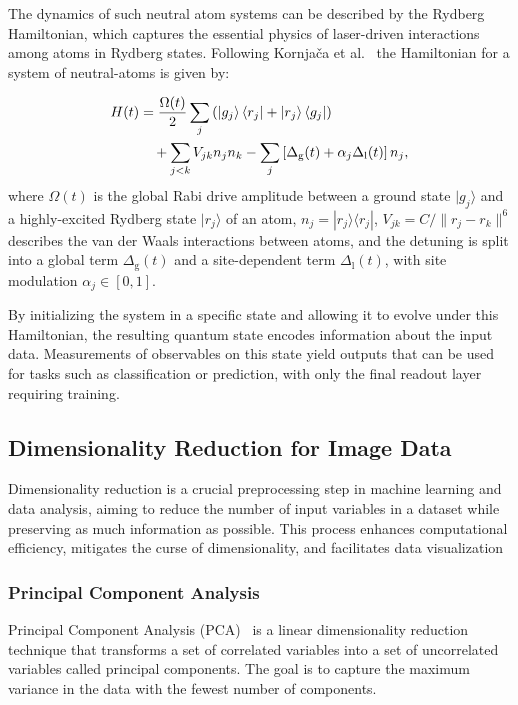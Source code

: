 \documentclass[conference]{IEEEtran}
\begin{document}
The dynamics of such neutral atom systems can be 
described by the Rydberg Hamiltonian, which captures 
the essential physics of laser-driven interactions 
among atoms in Rydberg states. Following Kornjača et al.~\cite{kornjavcaLargescaleQuantumReservoir2024}
the Hamiltonian for a system of neutral-atoms is given by:

\begin{equation}
    \begin{aligned}
        H(t) &= \dfrac{\Omega(t)}{2}\sum_j \left(\ket{g_j}\bra{r_j}+\ket{r_j}\bra{g_j}\right) \\
             &{{\quad}} + \sum_{j<k}V_{jk}n_jn_k - \sum_j \left[\Delta_{\mathrm{g}}(t) + \alpha_j\Delta_{\mathrm{l}}(t)\right] n_j,
    \end{aligned}
    \label{eq:rydberg_hamiltonian}
\end{equation}
where \( \Omega(t) \) is the global Rabi drive amplitude between a 
ground state \( |g_j\rangle \) and a highly-excited Rydberg state 
\( |r_j\rangle \) of an atom,
\( n_j = |r_j\rangle \langle r_j| \), 
\( V_{jk} = C/\|r_j - r_k\|^6 \) describes the van der Waals interactions
between atoms, and the detuning is split into a global term 
\( \Delta_{\mathrm{g}}(t) \)
and a site-dependent term \( \Delta_{\mathrm{l}}(t) \), with site 
modulation \( \alpha_j \in [0, 1] \).

By initializing the system in a specific state and allowing 
it to evolve under this Hamiltonian, the resulting quantum 
state encodes information about the input data. Measurements 
of observables on this state yield outputs that can be used 
for tasks such as classification or prediction, with only the 
final readout layer requiring training.


\subsection{Dimensionality Reduction for Image Data}
Dimensionality reduction is a crucial preprocessing step in 
machine learning and data analysis, aiming to reduce the 
number of input variables in a dataset while preserving as 
much information as possible. This process enhances 
computational efficiency, mitigates the curse of 
dimensionality, and facilitates data visualization


\subsubsection{Principal Component Analysis}
Principal Component Analysis (PCA)~\cite{shlensTutorialPrincipalComponent2014} is a linear dimensionality 
reduction technique that transforms a set of correlated 
variables into a set of uncorrelated variables called 
principal components. The goal is to capture the maximum 
variance in the data with the fewest number of components.
\end{document}
